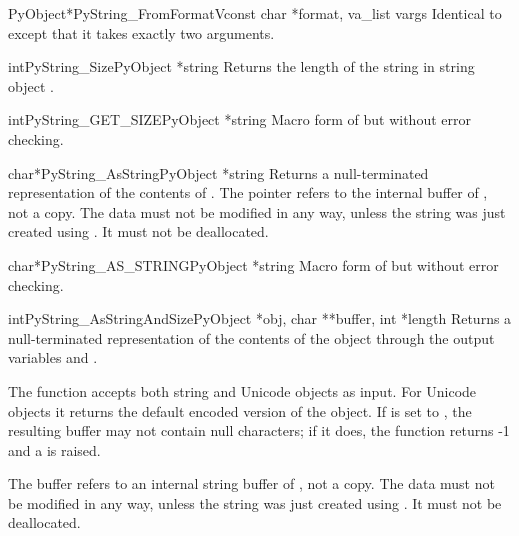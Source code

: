 \begin{cfuncdesc}{PyObject*}{PyString_FromFormatV}{const char *format,
                                                   va_list vargs}
  Identical to  except that it takes
  exactly two arguments.
\end{cfuncdesc}

\begin{cfuncdesc}{int}{PyString_Size}{PyObject *string}
  Returns the length of the string in string object .
\end{cfuncdesc}

\begin{cfuncdesc}{int}{PyString_GET_SIZE}{PyObject *string}
  Macro form of  but without error
  checking.
\end{cfuncdesc}

\begin{cfuncdesc}{char*}{PyString_AsString}{PyObject *string}
  Returns a null-terminated representation of the contents of
  .  The pointer refers to the internal buffer of
  , not a copy.  The data must not be modified in any way,
  unless the string was just created using
  .
  It must not be deallocated.
\end{cfuncdesc}

\begin{cfuncdesc}{char*}{PyString_AS_STRING}{PyObject *string}
  Macro form of  but without error
  checking.
\end{cfuncdesc}

\begin{cfuncdesc}{int}{PyString_AsStringAndSize}{PyObject *obj,
                                                 char **buffer,
                                                 int *length}
  Returns a null-terminated representation of the contents of the
  object  through the output variables  and
  .

  The function accepts both string and Unicode objects as input. For
  Unicode objects it returns the default encoded version of the
  object.  If  is set to \NULL, the resulting buffer may
  not contain null characters; if it does, the function returns -1 and
  a  is raised.

  The buffer refers to an internal string buffer of , not a
  copy. The data must not be modified in any way, unless the string
  was just created using .  It must not be deallocated.
\end{cfuncdesc}

